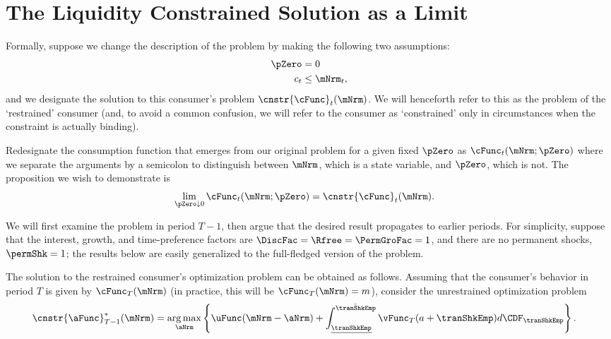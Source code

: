\documentclass[\econtexRoot/BufferStockTheory]{subfiles}
\begin{document}
\section{The Liquidity Constrained Solution as a Limit}\label{sec:LiqConstrAsLimit}

Formally, suppose we change the description of the problem by making
the following two assumptions:
\begin{eqnarray*}
  \pZero   & = 0
  \\  c_{t} & \leq  \mNrm_{t} \label{eq:liqconstr},
\end{eqnarray*}
and we designate the solution to this consumer's problem $\cnstr{\cFunc}_{t}(\mNrm)$.
We will henceforth refer to this as the problem of the `restrained' consumer (and, to avoid a common confusion, we will refer to the consumer as `constrained' only in circumstances when the constraint is actually binding).

Redesignate the consumption function that emerges from our original problem for a given fixed $\pZero$ as $\cFunc_{t}(\mNrm;\pZero)$ where we separate the arguments by a semicolon to distinguish between $\mNrm$, which is a state variable, and $\pZero$, which is not.
The proposition we wish to demonstrate is
\begin{equation}\begin{gathered}\begin{aligned}
      \lim_{\pZero \downarrow 0} \cFunc_{t}(\mNrm;\pZero)  & = \cnstr{\cFunc}_{t}(\mNrm). \label{eq:RestrEqUnrestr} 
    \end{aligned}\end{gathered}\end{equation}

We will first examine the problem in period $T-1$, then argue that the desired result propagates to earlier periods.
For simplicity, suppose that the interest, growth, and time-preference factors are $\DiscFac = \Rfree = \PermGroFac = 1$, and there are no permanent shocks, $\permShk=1$; the results below are easily generalized to the full-fledged version of the problem.

The solution to the restrained consumer's optimization problem can be obtained as follows.
Assuming that the consumer's behavior in period $T$ is given by $\cFunc_{T}(\mNrm)$ (in practice, this will be $\cFunc_{T}(\mNrm)=m$), consider the unrestrained optimization problem
\begin{equation}\begin{gathered}\begin{aligned}
      \cnstr{\aFunc}^{*}_{T-1}(\mNrm)  & = \underset{\aNrm}{\arg \max} \left\{\uFunc(\mNrm-\aNrm) +  \int_{\underline{\tranShkEmp}}^{\bar{\tranShkEmp}} \vFunc_{T}(a+\tranShkEmp) d\CDF_{\tranShkEmp} \right\}. \label{eq:vUnconstr}
    \end{aligned}\end{gathered}\end{equation}
\end{document}
